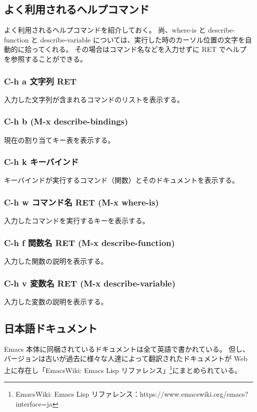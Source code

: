 \subsection{よく利用されるヘルプコマンド}
よく利用されるヘルプコマンドを紹介しておく。
尚、where-is と describe-function と describe-variable については、実行した時のカーソル位置の文字を自動的に拾ってくれる。
その場合はコマンド名などを入力せずに RET でヘルプを参照することができる。
\subsubsection{C-h a 文字列 RET}
入力した文字列が含まれるコマンドのリストを表示する。
\subsubsection{C-h b (M-x describe-bindings)}
現在の割り当てキー表を表示する。
\subsubsection{C-h k キーバインド}
キーバインドが実行するコマンド（関数）とそのドキュメントを表示する。
\subsubsection{C-h w コマンド名 RET (M-x where-is)}
入力したコマンドを実行するキーを表示する。
\subsubsection{C-h f 関数名 RET (M-x describe-function)}
入力した関数の説明を表示する。
\subsubsection{C-h v 変数名 RET (M-x describe-variable)}
入力した変数の説明を表示する。
\subsection{日本語ドキュメント}
Emacs 本体に同梱されているドキュメントは全て英語で書かれている。
但し、バージョンは古いが過去に様々な人達によって翻訳されたドキュメントが Web 上に存在し「EmacsWiki: Emacs Lisp リファレンス」\footnote{EmacsWiki: Emacs Lisp リファレンス：https://www.emacswiki.org/emacs?interface=ja}にまとめられている。
